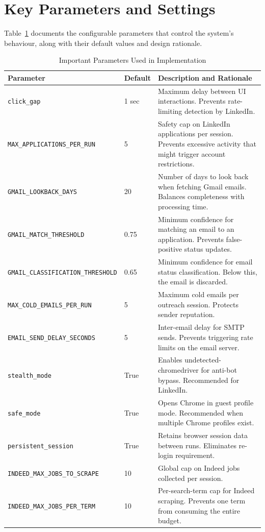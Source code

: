 \documentclass[12pt, a4paper, oneside]{report}
\begin{document}
\section{Key Parameters and Settings}
\label{sec:parameters}

Table~\ref{tab:parameters} documents the configurable parameters that control the system's behaviour, along with their default values and design rationale.

\begin{table}[H]
\centering
\caption{Important Parameters Used in Implementation}
\label{tab:parameters}
\begin{tabularx}{\textwidth}{|l|l|X|}
\hline
\textbf{Parameter} & \textbf{Default} & \textbf{Description and Rationale} \\
\hline
\texttt{click\_gap} & 1 sec & Maximum delay between UI interactions. Prevents rate-limiting detection by LinkedIn. \\
\hline
\texttt{MAX\_APPLICATIONS\_PER\_RUN} & 5 & Safety cap on LinkedIn applications per session. Prevents excessive activity that might trigger account restrictions. \\
\hline
\texttt{GMAIL\_LOOKBACK\_DAYS} & 20 & Number of days to look back when fetching Gmail emails. Balances completeness with processing time. \\
\hline
\texttt{GMAIL\_MATCH\_THRESHOLD} & 0.75 & Minimum confidence for matching an email to an application. Prevents false-positive status updates. \\
\hline
\texttt{GMAIL\_CLASSIFICATION\_THRESHOLD} & 0.65 & Minimum confidence for email status classification. Below this, the email is discarded. \\
\hline
\texttt{MAX\_COLD\_EMAILS\_PER\_RUN} & 5 & Maximum cold emails per outreach session. Protects sender reputation. \\
\hline
\texttt{EMAIL\_SEND\_DELAY\_SECONDS} & 5 & Inter-email delay for SMTP sends. Prevents triggering rate limits on the email server. \\
\hline
\texttt{stealth\_mode} & True & Enables undetected-chromedriver for anti-bot bypass. Recommended for LinkedIn. \\
\hline
\texttt{safe\_mode} & True & Opens Chrome in guest profile mode. Recommended when multiple Chrome profiles exist. \\
\hline
\texttt{persistent\_session} & True & Retains browser session data between runs. Eliminates re-login requirement. \\
\hline
\texttt{INDEED\_MAX\_JOBS\_TO\_SCRAPE} & 10 & Global cap on Indeed jobs collected per session. \\
\hline
\texttt{INDEED\_MAX\_JOBS\_PER\_TERM} & 10 & Per-search-term cap for Indeed scraping. Prevents one term from consuming the entire budget. \\
\hline
\end{tabularx}
\end{table}
\end{document}
